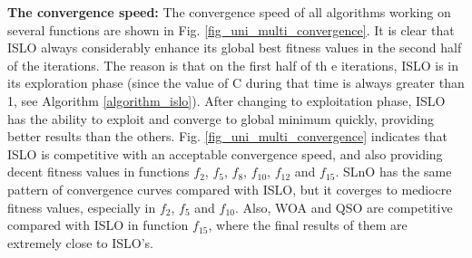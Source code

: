 \documentclass[../main.tex]{subfiles}
\begin{document}
	\textbf{The convergence speed:} The convergence speed of all algorithms working on several functions are shown in Fig. \ref{fig_uni_multi_convergence}. It is clear that ISLO always considerably enhance its global best fitness values in the second half of the iterations. The reason is that on the first half of th e iterations, ISLO is in its exploration phase (since the value of C during that time is always greater than 1, see Algorithm \ref{algorithm_islo}). After changing to exploitation phase, ISLO has the ability to exploit and converge to global minimum quickly, providing better results than the others. Fig. \ref{fig_uni_multi_convergence} indicates that ISLO is competitive with an acceptable convergence speed, and also providing decent fitness values in functions $f_2$, $f_5$, $f_8$, $f_{10}$, $f_{12} $ and $f_{15}$. SLnO has the same pattern of convergence curves compared with ISLO, but it coverges to mediocre fitness values, especially in $f_2$, $f_5$ and $f_{10}$. Also, WOA and QSO are competitive compared with ISLO in function $f_{15}$, where the final results of them are extremely close to ISLO's.
	
\end{document}
